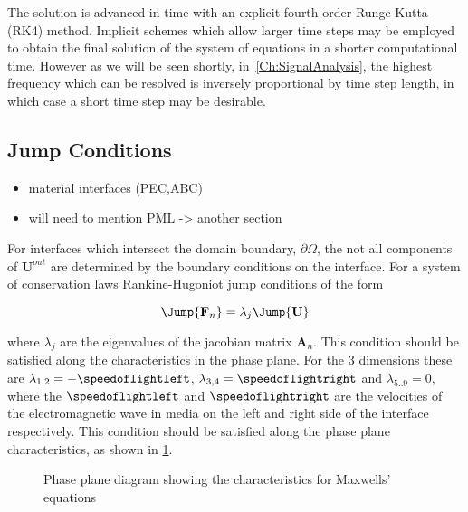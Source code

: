 The solution is advanced in time with an explicit fourth order Runge-Kutta (RK4) method. Implicit schemes which allow larger time steps may be employed to obtain the final solution of the system of equations in a shorter computational time. However as we will be seen shortly, in~\autoref{Ch:SignalAnalysis}, the highest frequency which can be resolved is inversely proportional by time step length, in which case a short time step may be desirable.
\subsection{Jump Conditions}
\begin{itemize}
	\item material interfaces (PEC,ABC)
  \item will need to mention PML -> another section
\end{itemize}

For interfaces which intersect the domain boundary, $\partial \Omega$, the not all components of $\mathbf{U}^{out}$ are determined by the boundary conditions on the interface. For a system of conservation laws Rankine-Hugoniot jump conditions of the form

$$
\Jump{ \mathbf{F}_n } = \lambda_j \Jump{ \mathbf{U} }
$$

where $\lambda_j$ are the eigenvalues of the jacobian matrix $\mathbf{A}_n$.
This condition should be satisfied along the characteristics in the phase plane.
For the 3 dimensions these are $ \lambda_{ 1,2 } = - \speedoflightleft $, $
\lambda_{ 3,4 } = \speedoflightright $ and $\lambda_{5..9} = 0 $, where the
$\speedoflightleft$ and $\speedoflightright$ are the velocities of the
electromagnetic wave in media on the left and right side of the interface
respectively. This condition should be satisfied along the phase plane
characteristics, as shown in \ref{fig:phase-plane-characteristics}.

\begin{figure}[h]
  \centering
  
  \caption{Phase plane diagram showing the characteristics for Maxwells' equations}
  \label{fig:phase-plane-characteristics}
\end{figure}

